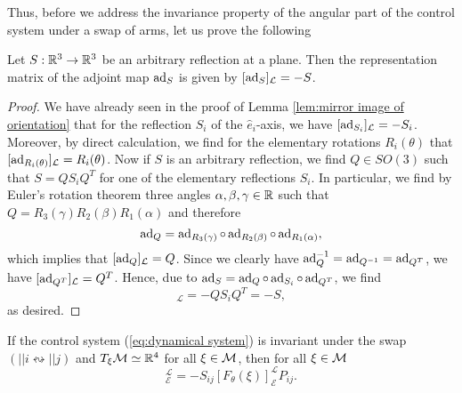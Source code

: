 Thus, before we address the invariance property of the angular part of the control system under a swap of arms, let us prove the following

\begin{lemma}
\label{lem:representation matrix of adjoint of reflection}
Let $S: \mathbb{R}^3 \to \mathbb{R}^3$ be an arbitrary reflection at a plane. Then the representation matrix of the adjoint map $\operatorname{ad}_S$ is given by $[\operatorname{ad}_S]_{\mathcal{L}} = -S$.
\end{lemma}


\begin{proof}
We have already seen in the proof of Lemma \ref{lem:mirror image of orientation} that for the reflection $S_i$ of the $\hat{e}_i$-axis, we have $[\operatorname{ad}_{S_i}]_{\mathcal{L}} = -S_i$. Moreover, by direct calculation, we find for the elementary rotations $R_i(\theta)$ that $[\operatorname{ad}_{R_i(\theta)}]_{\mathcal{L}} = R_{i}(\theta)$. Now if $S$ is an arbitrary reflection, we find $Q \in SO(3)$ such that $S = Q S_i Q^T$ for one of the elementary reflections $S_i$. In particular, we find by Euler's rotation theorem three angles $\alpha, \beta, \gamma \in \mathbb{R}$ such that $Q = R_{3}(\gamma) R_{2}(\beta) R_{1}(\alpha)$ and therefore
\begin{equation}
\operatorname{ad}_Q = \operatorname{ad}_{R_3(\gamma)} \circ \operatorname{ad}_{R_{2}(\beta)} \circ \operatorname{ad}_{R_{1}(\alpha)},
\end{equation}
which implies that $[\operatorname{ad}_{Q}]_{\mathcal{L}} = Q$. Since we clearly have $\operatorname{ad}_{Q}^{-1} = \operatorname{ad}_{Q^{-1}} = \operatorname{ad}_{Q^T}$, we have $[\operatorname{ad}_{Q^T}]_{\mathcal{L}} = Q^T$. Hence, due to $\operatorname{ad}_S = \operatorname{ad}_Q \circ \operatorname{ad}_{S_i} \circ \operatorname{ad}_{Q^T}$, we find
\begin{equation}
[\ad_S]_{\mathcal{L}} = - Q S_i Q^T = -S,
\end{equation}
as desired.
\end{proof}

\begin{proposition}
\label{prop: angular permutation invariance}
If the control system (\ref{eq:dynamical system}) is invariant under the swap $(||i \leftrightsquigarrow ||j)$ and $T_{\xi}\mathcal{M} \simeq \mathbb{R}^4$ for all $\xi \in \mathcal{M}$, then for all $\xi \in \mathcal{M}$
\begin{equation}
[F_{\theta}(P_{ij} \xi)]_{\mathcal{E}}^{\mathcal{L}} = - S_{ij} [F_{\theta}(\xi)]_{\mathcal{E}}^{\mathcal{L}} P_{ij}.
\end{equation}
\end{proposition}


